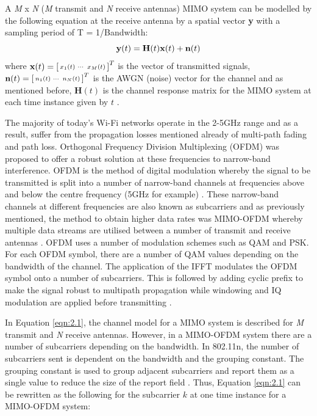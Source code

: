 A \textit{M} x \textit{N} (\textit{M} transmit and \textit{N} receive antennas) MIMO system can be modelled by the following equation at the receive antenna by a spatial vector \textbf{y} with a sampling period of T = 1/Bandwidth:
\vspace{-11pt}
\begin{equation}\label{eqn:2.1}
    \textbf{y}(t) = \textbf{H}(t)\textbf{x}(t)+\textbf{n}(t)
    \vspace{-11pt}
\end{equation}
where  $\textbf{x}(t) = \begin{bsmallmatrix}x_1(t) & \cdots & x_M(t)\end{bsmallmatrix}^T$ is the vector of transmitted signals, $\textbf{n}(t) = \begin{bsmallmatrix}n_1(t) & \cdots & n_N(t)\end{bsmallmatrix}^T$ is the AWGN (noise) vector for the channel and as mentioned before, $\textbf{H}(t)$ is the channel response matrix for the MIMO system at each time instance given by $t$ \citep{channelEquations}. \par
The majority of today's Wi-Fi networks operate in the 2-5GHz range and as a result, suffer from the propagation losses mentioned already of multi-path fading and path loss. Orthogonal Frequency Division Multiplexing (OFDM) was proposed to offer a robust solution at these frequencies to narrow-band interference. OFDM is the method of digital modulation whereby the signal to be transmitted is split into a number of narrow-band channels at frequencies above and below the centre frequency (5GHz for example) \citep{OFDM}.
These narrow-band channels at different frequencies are also known as subcarriers and as previously mentioned, the method to obtain higher data rates was MIMO-OFDM whereby multiple data streams are utilised between a number of transmit and receive antennas \citep{802.11nStandard}. OFDM uses a number of modulation schemes such as QAM and PSK. For each OFDM symbol, there are a number of QAM values depending on the bandwidth of the channel. The application of the IFFT modulates the OFDM symbol onto a number of subcarriers. This is followed by adding cyclic prefix to make the signal robust to multipath propagation while windowing and IQ modulation are applied before transmitting \citep{OFDM, 802.11nStandard}. \par
In Equation \ref{eqn:2.1}, the channel model for a MIMO system is described for \textit{M} transmit and \textit{N} receive antennas. However, in a MIMO-OFDM system there are a number of subcarriers depending on the bandwidth. In 802.11n, the number of subcarriers sent is dependent on the bandwidth and the grouping constant. The grouping constant is used to group adjacent subcarriers and report them as a single value to reduce the size of the report field \citep{full802.11nStandard}. Thus, Equation \ref{eqn:2.1} can be rewritten as the following for the subcarrier $k$ at one time instance for a MIMO-OFDM system:
